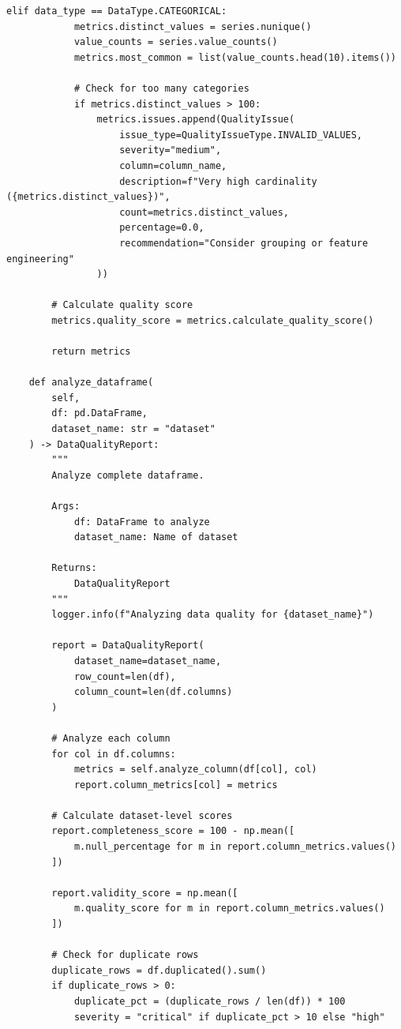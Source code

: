 \begin{lstlisting}[style=python, caption={Data quality metrics with statistical validation}]
        elif data_type == DataType.CATEGORICAL:
            metrics.distinct_values = series.nunique()
            value_counts = series.value_counts()
            metrics.most_common = list(value_counts.head(10).items())

            # Check for too many categories
            if metrics.distinct_values > 100:
                metrics.issues.append(QualityIssue(
                    issue_type=QualityIssueType.INVALID_VALUES,
                    severity="medium",
                    column=column_name,
                    description=f"Very high cardinality ({metrics.distinct_values})",
                    count=metrics.distinct_values,
                    percentage=0.0,
                    recommendation="Consider grouping or feature engineering"
                ))

        # Calculate quality score
        metrics.quality_score = metrics.calculate_quality_score()

        return metrics

    def analyze_dataframe(
        self,
        df: pd.DataFrame,
        dataset_name: str = "dataset"
    ) -> DataQualityReport:
        """
        Analyze complete dataframe.

        Args:
            df: DataFrame to analyze
            dataset_name: Name of dataset

        Returns:
            DataQualityReport
        """
        logger.info(f"Analyzing data quality for {dataset_name}")

        report = DataQualityReport(
            dataset_name=dataset_name,
            row_count=len(df),
            column_count=len(df.columns)
        )

        # Analyze each column
        for col in df.columns:
            metrics = self.analyze_column(df[col], col)
            report.column_metrics[col] = metrics

        # Calculate dataset-level scores
        report.completeness_score = 100 - np.mean([
            m.null_percentage for m in report.column_metrics.values()
        ])

        report.validity_score = np.mean([
            m.quality_score for m in report.column_metrics.values()
        ])

        # Check for duplicate rows
        duplicate_rows = df.duplicated().sum()
        if duplicate_rows > 0:
            duplicate_pct = (duplicate_rows / len(df)) * 100
            severity = "critical" if duplicate_pct > 10 else "high"


\end{lstlisting}

